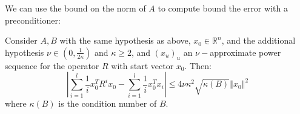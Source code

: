 We can use the bound on the norm of $A$ to compute bound the error
with a preconditioner:

\begin{lemma}\label{lem:partial-sequence-approximate}Consider $A,B$
with the same hypothesis as above, $x_{0}\in\mathbb{R}^{n}$, and
the additional hypothesis $\nu\in\left(0,\frac{1}{2\kappa}\right)$
and $\kappa\ge2$, and $\left(x_{u}\right)_{u}$ an $\nu-$approximate
power sequence for the operator $R$ with start vector $x_{0}$. Then:
\[
\left|\sum_{i=1}^{l}\frac{1}{i}x_{0}^{T}R^{i}x_{0}-\sum_{i=1}^{l}\frac{1}{i}x_{0}^{T}x_{i}\right|\leq4\nu\kappa^{2}\sqrt{\kappa\left(B\right)}\left\Vert x_{0}\right\Vert ^{2}
\]
 where $\kappa\left(B\right)$ is the condition number of $B$.

\end{lemma}

